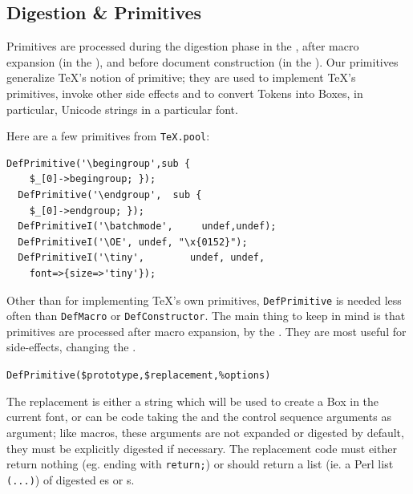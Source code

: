 \documentclass{book}
\newcommand{\ltxcode}{\lstinline[style=latexml]}
\begin{document}

\subsection[Digestion]{Digestion \& Primitives}\label{customization.latexml.digestion}
Primitives are processed during the digestion phase in the ,
after macro expansion (in the ),
and before document construction (in the ).
Our primitives generalize \TeX's notion of primitive; they are used to implement
\TeX's primitives, invoke other side effects and to convert Tokens into Boxes,
in particular, Unicode strings in a particular font.

Here are a few primitives from \texttt{TeX.pool}:
\begin{lstlisting}[style=latexml]
  DefPrimitive('\begingroup',sub {
    $_[0]->begingroup; });
  DefPrimitive('\endgroup',  sub {
    $_[0]->endgroup; });
  DefPrimitiveI('\batchmode',     undef,undef);
  DefPrimitiveI('\OE', undef, "\x{0152}");
  DefPrimitiveI('\tiny',        undef, undef,
    font=>{size=>'tiny'});
\end{lstlisting}

Other than for implementing \TeX's own primitives,
\texttt{DefPrimitive} is needed less often than \texttt{DefMacro} or \texttt{DefConstructor}.
 The main thing to keep in mind
is that primitives are processed after macro expansion,
by the .  They are most useful for
side-effects, changing the .

\par\noindent\ltxcode|DefPrimitive($prototype,$replacement,%
\par

The replacement is either a string which will be used to create
a Box in the current font, or can be code taking the 
and the control sequence arguments as argument; like macros, these arguments
are not expanded or digested by default, they must be explicitly digested if necessary.
The replacement code must either return nothing (eg. ending with \ltxcode|return;|) or
should return a list (ie. a Perl list \ltxcode|(...)|)
of digested es or s.
\end{document}
